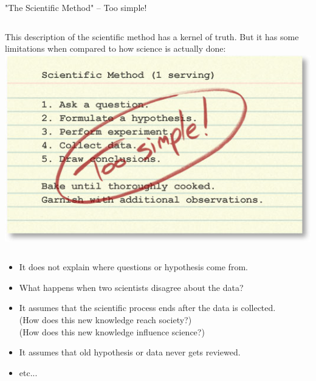 \begin{frame}{"The Scientific Method" -- Too simple!}{}
  \begin{columns}
      This description of the scientific method has a kernel of truth. But it has some limitations when compared to how science is actually done:
      \includegraphics[width=1\textwidth]{../img/scientific_method_simple}
  \end{columns}
  \vfill

  {\smaller
  \begin{itemize}
    \item It does not explain where questions or hypothesis come from.
    \item What happens when two scientists disagree about the data?
    \item It assumes that the scientific process ends after the data is collected.\\
      \hfill (How does this new knowledge reach society?)\\
      \hfill (How does this new knowledge influence science?)
    \item It assumes that old hypothesis or data never gets reviewed.
    \item etc...
  \end{itemize}
  }
\end{frame}

